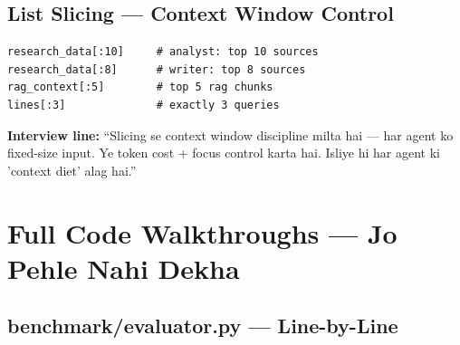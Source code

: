 \subsection{List Slicing --- Context Window Control}

\begin{codestorybox}
\begin{lstlisting}[style=pythonstyle]
research_data[:10]     # analyst: top 10 sources
research_data[:8]      # writer: top 8 sources
rag_context[:5]        # top 5 rag chunks
lines[:3]              # exactly 3 queries
\end{lstlisting}

\textbf{Interview line:} ``Slicing se context window discipline milta hai --- har agent ko fixed-size input. Ye token cost + focus control karta hai. Isliye hi har agent ki 'context diet' alag hai.''
\end{codestorybox}

\section{Full Code Walkthroughs --- Jo Pehle Nahi Dekha}

\subsection{benchmark/evaluator.py --- Line-by-Line}

